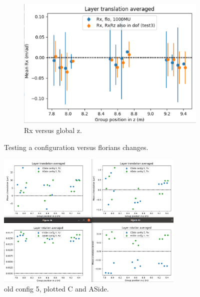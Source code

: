 \begin{figure}
\begin{subfigure}[b]{0.3\textwidth}
    \centering
    \includegraphics[width=\textwidth]{plots/july_28/Rx.png}
    \caption{Rx versus global z.}
  \end{subfigure}
  \caption{Testing a configuration versus florians changes.}
\end{figure}

\begin{figure}
  \centering
  \includegraphics[width=0.8\textwidth]{plots/august_13/C_ASide_config5.png}
  \caption{old config 5, plotted C and ASide.}
  \label{fig:aug13_CA_old}
\end{figure}

